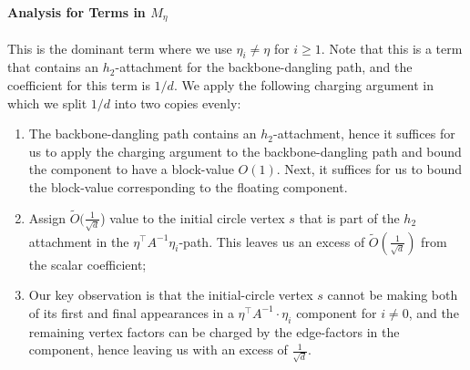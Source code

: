 \documentclass[12pt]{article}
\begin{document}
\paragraph{Analysis for Terms in $M_\eta $}	
This is the dominant term where we use $\eta_i\neq \eta$ for $i\geq 1$. Note that this is a term that contains an $h_2$-attachment for the backbone-dangling path, and the coefficient for this term is  $1/d$.  We apply the following charging argument in which we split $1/d$ into two copies evenly:
\begin{enumerate}
	\item The backbone-dangling path contains an $h_2$-attachment, hence it suffices for us to apply the charging argument to the backbone-dangling path and bound the component to have a block-value $O(1)$. Next, it suffices for us to bound the block-value corresponding to the floating component.
	\item Assign $\tilde{O}(\frac{1}{\sqrt{d}}$) value to the initial circle vertex $s$ that is part of the $h_2$ attachment in the $\eta^\top A^{-1} \eta_i $-path. This leaves us an excess of $\tilde{O}( \frac{1}{\sqrt{d}})$ from the scalar coefficient;
	\item Our key observation is that the initial-circle vertex $s$ cannot be making both of its first and final appearances in a $\eta^\top A^{-1} \cdot \eta_i$ component for $i\neq 0$, and the remaining vertex factors can be charged by the edge-factors in the component, hence leaving us with an excess of $\frac{1}{\sqrt{d}}$.
\end{enumerate}
\end{document}
